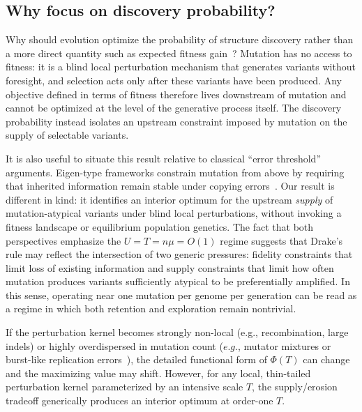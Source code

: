 \documentclass[9pt,twocolumn,oneside]{pnas-new}
\begin{document}
\subsection*{Why focus on discovery probability?}
Why should evolution optimize the probability of structure discovery rather than a more direct quantity such as expected fitness gain~\cite{Lynch2010,SniegowskiRaynes2013,Hershberg2015}? Mutation has no access to fitness: it is a blind local perturbation mechanism that generates variants without foresight, and selection acts only after these variants have been produced. Any objective defined in terms of fitness therefore lives downstream of mutation and cannot be optimized at the level of the generative process itself. The discovery probability instead isolates an upstream constraint imposed by mutation on the supply of selectable variants.

It is also useful to situate this result relative to classical ``error threshold'' arguments. Eigen-type frameworks constrain mutation from above by requiring that inherited information remain stable under copying errors~\cite{Eigen1971}. Our result is different in kind: it identifies an interior optimum for the upstream \emph{supply} of mutation-atypical variants under blind local perturbations, without invoking a fitness landscape or equilibrium population genetics. The fact that both perspectives emphasize the $U=T=n\mu=O(1)$ regime suggests that Drake's rule may reflect the intersection of two generic pressures: fidelity constraints that limit loss of existing information and supply constraints that limit how often mutation produces variants sufficiently atypical to be preferentially amplified. In this sense, operating near one mutation per genome per generation can be read as a regime in which both retention and exploration remain nontrivial.

If the perturbation kernel becomes strongly non-local (e.g., recombination, large indels) or highly overdispersed in mutation count ($e.g.$, mutator mixtures or burst-like replication errors~\cite{SniegowskiRaynes2013,martin2024non}), the detailed functional form of $\Phi(T)$ can change and the maximizing value may shift. However, for any local, thin-tailed perturbation kernel parameterized by an intensive scale $T$, the supply/erosion tradeoff generically produces an interior optimum at order-one $T$.
\end{document}
